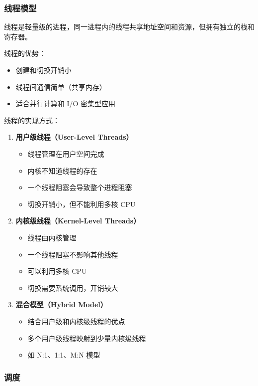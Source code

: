 \subsubsection{线程模型}

线程是轻量级的进程，同一进程内的线程共享地址空间和资源，但拥有独立的栈和寄存器。

线程的优势：
\begin{itemize}
  \item 创建和切换开销小
  \item 线程间通信简单（共享内存）
  \item 适合并行计算和 I/O 密集型应用
\end{itemize}

线程的实现方式：

\begin{enumerate}
  \item \textbf{用户级线程（User-Level Threads）}
    \begin{itemize}
      \item 线程管理在用户空间完成
      \item 内核不知道线程的存在
      \item 一个线程阻塞会导致整个进程阻塞
      \item 切换开销小，但不能利用多核 CPU
    \end{itemize}

  \item \textbf{内核级线程（Kernel-Level Threads）}
    \begin{itemize}
      \item 线程由内核管理
      \item 一个线程阻塞不影响其他线程
      \item 可以利用多核 CPU
      \item 切换需要系统调用，开销较大
    \end{itemize}

  \item \textbf{混合模型（Hybrid Model）}
    \begin{itemize}
      \item 结合用户级和内核级线程的优点
      \item 多个用户级线程映射到少量内核级线程
      \item 如 N:1、1:1、M:N 模型
    \end{itemize}
\end{enumerate}

\subsubsection{调度}

